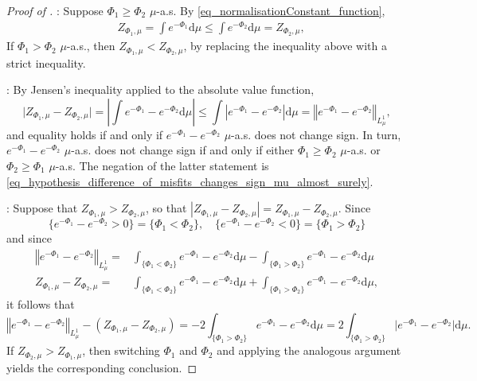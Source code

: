 \documentclass[a4paper]{scrartcl}
\theoremstyle{definition}
\numberwithin{equation}{section}
\newcommand{\rd}{\mathrm{d}}
\newcommand{\abs}[1]{\vert #1\vert}
\newcommand{\Abs}[1]{\left\vert#1\right\vert}
\newcommand{\Norm}[1]{\left\Vert #1 \right\Vert}
\begin{document}
\begin{proof}[Proof of ] 

: Suppose $\Phi_1\geq \Phi_2$ $\mu$-a.s. By \eqref{eq_normalisationConstant_function},
\begin{align*}
 &Z_{\Phi_1,\mu}=\int e^{-\Phi_1}\rd \mu\leq \int e^{-\Phi_2}\rd \mu=Z_{\Phi_2,\mu},
\end{align*}
If $\Phi_1>\Phi_2$ $\mu$-a.s., then $Z_{\Phi_1,\mu}<Z_{\Phi_2,\mu}$, by replacing the inequality above with a strict inequality.

: 
By Jensen's inequality applied to the absolute value function,
\begin{equation*}
 \abs{Z_{\Phi_1,\mu}-Z_{\Phi_2,\mu}}=\Abs{\int e^{-\Phi_1}-e^{-\Phi_2}\rd \mu}\leq \int \Abs{e^{-\Phi_1}-e^{-\Phi_2}}\rd \mu=\Norm{e^{-\Phi_1}-e^{-\Phi_2}}_{L^1_\mu},
\end{equation*}
and equality holds if and only if $e^{-\Phi_1}-e^{-\Phi_2}$ $\mu$-a.s. does not change sign. In turn, $e^{-\Phi_1}-e^{-\Phi_2}$ $\mu$-a.s. does not change sign if and only if either $\Phi_1\geq \Phi_2$ $\mu$-a.s. or $\Phi_2\geq \Phi_1$ $\mu$-a.s. The negation of the latter statement is \eqref{eq_hypothesis_difference_of_misfits_changes_sign_mu_almost_surely}.

: Suppose that $Z_{\Phi_1,\mu}>Z_{\Phi_2,\mu}$, so that $\Abs{Z_{\Phi_1,\mu}-Z_{\Phi_2,\mu}} =Z_{\Phi_1,\mu}-Z_{\Phi_2,\mu}$.
Since
\begin{equation*}
 \{e^{-\Phi_1}-e^{-\Phi_2}> 0\}=\{\Phi_1<\Phi_2\},\quad \{e^{-\Phi_1}-e^{-\Phi_2}< 0\}=\{\Phi_1> \Phi_2\}
\end{equation*}
and since
\begin{align*}
 \Norm{e^{-\Phi_1}-e^{-\Phi_2}}_{L^1_\mu}=&\int_{\{\Phi_1< \Phi_2\}}e^{-\Phi_1}-e^{-\Phi_2}\rd \mu- \int_{\{\Phi_1>\Phi_2\}}e^{-\Phi_1}-e^{-\Phi_2}\rd \mu
 \\
 Z_{\Phi_1,\mu}-Z_{\Phi_2,\mu}=&\int_{\{\Phi_1<\Phi_2\}}e^{-\Phi_1}-e^{-\Phi_2}\rd \mu+\int_{\{\Phi_1>\Phi_2\}}e^{-\Phi_1}-e^{-\Phi_2}\rd \mu,
\end{align*}
it follows that 
\begin{equation*}
 \Norm{e^{-\Phi_1}-e^{-\Phi_2}}_{L^1_\mu}-(Z_{\Phi_1,\mu}-Z_{\Phi_2,\mu})
=-2\int_{\{\Phi_1>\Phi_2\}}e^{-\Phi_1}-e^{-\Phi_2}\rd \mu =2\int_{\{\Phi_1>\Phi_2\}} \abs{e^{-\Phi_1}-e^{-\Phi_2}}\rd \mu.
 \end{equation*}
 If $Z_{\Phi_2,\mu}>Z_{\Phi_1,\mu}$, then switching $\Phi_1$ and $\Phi_2$ and applying the analogous argument yields the corresponding conclusion.
 \end{proof}
\end{document}
